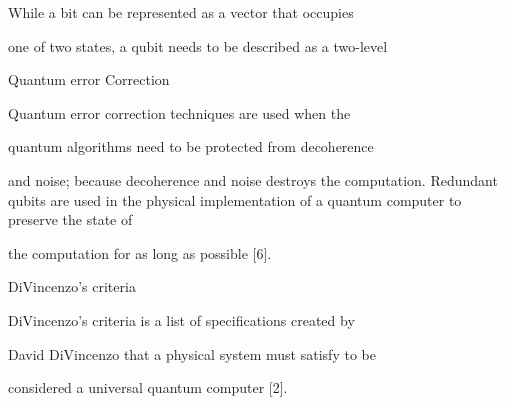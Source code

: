 \documentclass[a4paper,portrait,12pt]{article}
\begin{document}
\begin{flushleft}
While a bit can be represented as a vector that occupies
\end{flushleft}


\begin{flushleft}
one of two states, a qubit needs to be described as a two-level
\end{flushleft}





\begin{flushleft}
Quantum error Correction
\end{flushleft}





\begin{flushleft}
Quantum error correction techniques are used when the
\end{flushleft}


\begin{flushleft}
quantum algorithms need to be protected from decoherence
\end{flushleft}


\begin{flushleft}
and noise; because decoherence and noise destroys the computation. Redundant qubits are used in the physical implementation of a quantum computer to preserve the state of
\end{flushleft}


\begin{flushleft}
the computation for as long as possible [6].
\end{flushleft}





\begin{flushleft}
DiVincenzo's criteria
\end{flushleft}





\begin{flushleft}
DiVincenzo's criteria is a list of specifications created by
\end{flushleft}


\begin{flushleft}
David DiVincenzo that a physical system must satisfy to be
\end{flushleft}


\begin{flushleft}
considered a universal quantum computer [2].
\end{flushleft}
\end{document}
